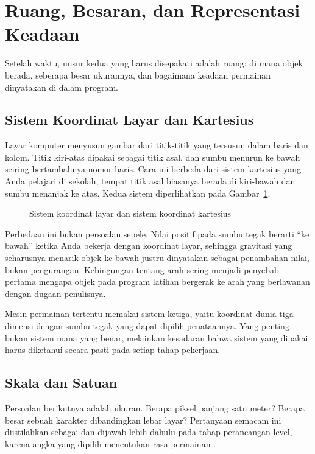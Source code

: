 \section{Ruang, Besaran, dan Representasi Keadaan}
\label{sec:ruang-keadaan}

Setelah waktu, unsur kedua yang harus disepakati adalah ruang: di mana objek
berada, seberapa besar ukurannya, dan bagaimana keadaan permainan dinyatakan
di dalam program.

\subsection{Sistem Koordinat Layar dan Kartesius}

Layar komputer menyusun gambar dari titik-titik yang tersusun dalam baris dan
kolom. Titik kiri-atas dipakai sebagai titik asal, dan sumbu menurun ke bawah
seiring bertambahnya nomor baris. Cara ini berbeda dari sistem kartesius yang
Anda pelajari di sekolah, tempat titik asal biasanya berada di kiri-bawah dan
sumbu menanjak ke atas. Kedua sistem diperlihatkan pada
Gambar~\ref{fig:koordinat}.

\begin{figure}[htbp]
\centering

\caption{Sistem koordinat layar dan sistem koordinat kartesius}
\label{fig:koordinat}
\end{figure}

Perbedaan ini bukan persoalan sepele. Nilai positif pada sumbu tegak berarti
``ke bawah'' ketika Anda bekerja dengan koordinat layar, sehingga gravitasi
yang seharusnya menarik objek ke bawah justru dinyatakan sebagai penambahan
nilai, bukan pengurangan. Kebingungan tentang arah sering menjadi penyebab
pertama mengapa objek pada program latihan bergerak ke arah yang berlawanan
dengan dugaan penulisnya.

Mesin permainan tertentu memakai sistem ketiga, yaitu koordinat dunia tiga
dimensi dengan sumbu tegak yang dapat dipilih penataannya. Yang penting bukan
sistem mana yang benar, melainkan kesadaran bahwa sistem yang dipakai harus
diketahui secara pasti pada setiap tahap pekerjaan.

\subsection{Skala dan Satuan}

Persoalan berikutnya adalah ukuran. Berapa piksel panjang satu meter? Berapa
besar sebuah karakter dibandingkan lebar layar? Pertanyaan semacam ini
diistilahkan sebagai  dan dijawab lebih dahulu pada tahap
perancangan level, karena angka yang dipilih menentukan rasa permainan
\cite{unity-leveldesign}.

